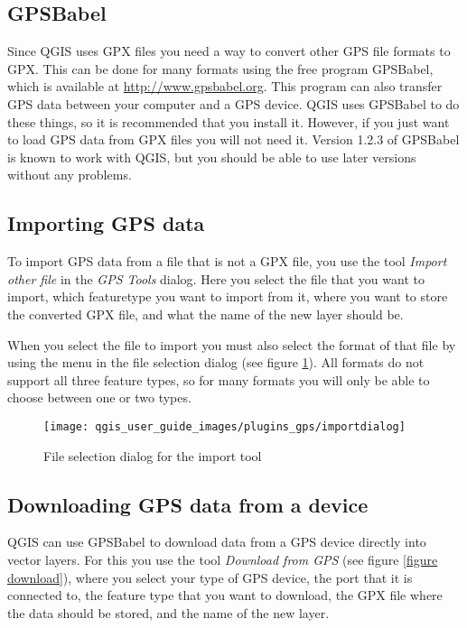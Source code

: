 \subsection{GPSBabel}

Since QGIS uses GPX files you need a way to convert other GPS file
formats to GPX. This can be done for many formats using the free program
GPSBabel, which is available at \url{http://www.gpsbabel.org}. This
program can also transfer GPS data between your computer and a GPS
device. QGIS uses GPSBabel to do these things, so it is recommended
that you install it. However, if you just want to load GPS data from
GPX files you will not need it. Version 1.2.3 of GPSBabel is known
to work with QGIS, but you should be able to use later versions without
any problems.


\subsection{Importing GPS data}

To import GPS data from a file that is not a GPX file, you use the
tool \emph{Import other file} in the \emph{GPS Tools} dialog. Here
you select the file that you want to import, which featuretype you
want to import from it, where you want to store the converted GPX
file, and what the name of the new layer should be.

When you select the file to import you must also select the format
of that file by using the menu in the file selection dialog (see figure
\ref{figure importdialog}). All formats do not support all three
feature types, so for many formats you will only be able to choose
between one or two types.

%
\begin{figure}

\caption{\label{figure importdialog}File selection dialog for the import
tool}

\texttt{[image: qgis\_user\_guide\_images/plugins\_gps/importdialog]}
\end{figure}



\subsection{Downloading GPS data from a device}

QGIS can use GPSBabel to download data from a GPS device directly
into vector layers. For this you use the tool \emph{Download from
GPS} (see figure \ref{figure download}), where you select your type
of GPS device, the port that it is connected to, the feature type
that you want to download, the GPX file where the data should be stored,
and the name of the new layer.

